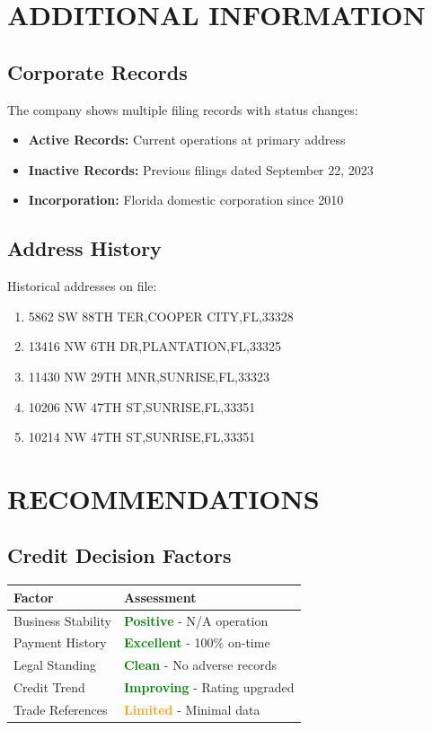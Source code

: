 \documentclass[11pt,a4paper]{article}
\begin{document}
\section{ADDITIONAL INFORMATION}

\subsection{Corporate Records}
The company shows multiple filing records with status changes:
\begin{itemize}
    \item \textbf{Active Records:} Current operations at primary address
    \item \textbf{Inactive Records:} Previous filings dated September 22, 2023
    \item \textbf{Incorporation:} Florida domestic corporation since 2010
\end{itemize}

\subsection{Address History}
Historical addresses on file:
\begin{enumerate}
    \item 5862 SW 88TH TER,COOPER CITY,FL,33328
\item 13416 NW 6TH DR,PLANTATION,FL,33325
\item 11430 NW 29TH MNR,SUNRISE,FL,33323
\item 10206 NW 47TH ST,SUNRISE,FL,33351
\item 10214 NW 47TH ST,SUNRISE,FL,33351

\end{enumerate}

\section{RECOMMENDATIONS}

\subsection{Credit Decision Factors}
\begin{tabularx}{\textwidth}{|l|X|}
\hline
\rowcolor{lightgray}
\textbf{Factor} & \textbf{Assessment} \\
\hline
Business Stability & \textcolor{green}{\textbf{Positive}} - N/A operation \\
\hline
Payment History & \textcolor{green}{\textbf{Excellent}} - 100\% on-time \\
\hline
Legal Standing & \textcolor{green}{\textbf{Clean}} - No adverse records \\
\hline
Credit Trend & \textcolor{green}{\textbf{Improving}} - Rating upgraded \\
\hline
Trade References & \textcolor{orange}{\textbf{Limited}} - Minimal data \\
\hline
\end{tabularx}
\end{document}
